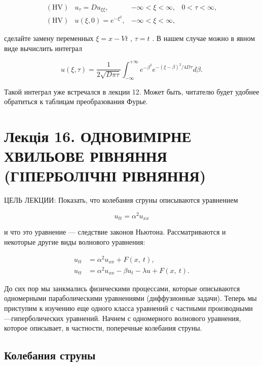 \documentclass[
  ukrainian,
]{article}
\begin{document}
\[
\begin{array}{ll} (\text{HV}) & u_{\tau} = Du_{\xi\xi}, & -\infty < \xi < \infty, & 0 < \tau < \infty, \\ (\text{HV}) & u(\xi, 0) = e^{-\xi^2}, & -\infty < \xi < \infty, \end{array}
\]

сделайте замену переменных \(\xi = x - Vt\) , \(\tau = t\) . В нашем
случае можно в явном виде вычислить интеграл

\[
u(\xi, \tau) = \frac{1}{2\sqrt{D\pi\tau}} \int_{-\infty}^{+\infty} e^{-\beta^2} e^{-(\xi-\beta)^2/4D\tau} d\beta.
\]

Такой интеграл уже встречался в лекции 12. Может быть, читателю будет
удобнее обратиться к таблицам преобразования Фурье.

\section{Лекція 16. ОДНОВИМІРНЕ ХВИЛЬОВЕ РІВНЯННЯ (ГІПЕРБОЛІЧНІ
РІВНЯННЯ)}\label{ux43bux435ux43aux446ux456ux44f-16.-ux43eux434ux43dux43eux432ux438ux43cux456ux440ux43dux435-ux445ux432ux438ux43bux44cux43eux432ux435-ux440ux456ux432ux43dux44fux43dux43dux44f-ux433ux456ux43fux435ux440ux431ux43eux43bux456ux447ux43dux456-ux440ux456ux432ux43dux44fux43dux43dux44f}

ЦЕЛЬ ЛЕКЦИИ: Показать, что колебания сгруны описываются уравнением

\[
u_{tt} = \alpha^2 u_{xx}
\]

и что это уравнение --- следствие законов Ньютона. Рассматриваются и
некоторые другие виды волнового уравнения:

\[
\begin{split} u_{tt} &= \alpha^2 u_{xx} + F\left(x, \ t\right), \\ u_{tt} &= \alpha^2 u_{xx} - \beta u_t - \lambda u + F\left(x, \ t\right). \end{split}
\]

До сих пор мы занкмались физическими процессами, которые описываются
одномерными параболическими уравнениями (диффузионные задачи). Теперь мы
приступим к изучению еще одного класса уравнений с частными
производными---гиперболических уравнений. Начнем с одномерного волнового
уравнения, которое описывает, в частности, поперечные колебания струны.

\subsection{Колебания
струны}\label{ux43aux43eux43bux435ux431ux430ux43dux438ux44f-ux441ux442ux440ux443ux43dux44b}
\end{document}
